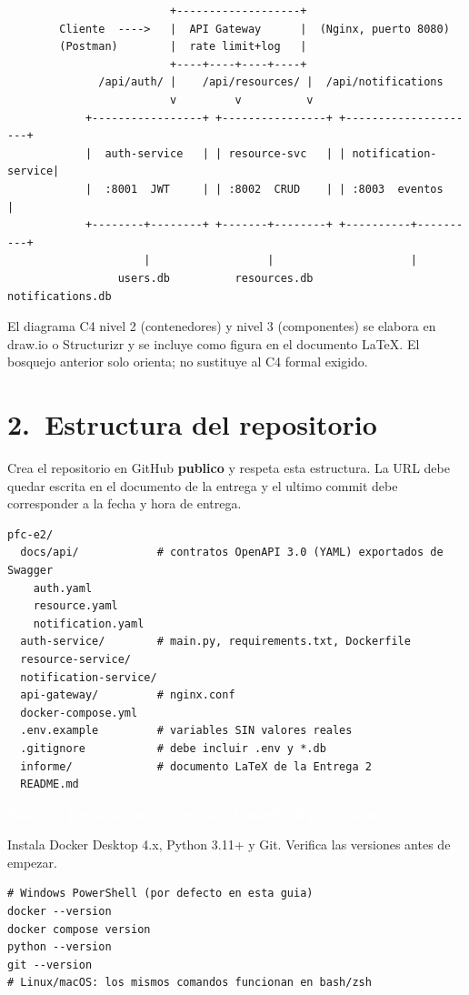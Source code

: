 \documentclass[11pt]{article}
\newcommand{\pasohead}[2]{%
\vspace{4pt}%
\begin{tcolorbox}[colback=azulMedio,colframe=azulMedio,boxrule=0pt,arc=2pt,left=8pt,right=8pt,top=4pt,bottom=4pt]
\textcolor{white}{\textbf{Paso #1.\ \ #2}}\end{tcolorbox}}
\begin{document}
\begin{lstlisting}
                         +-------------------+
        Cliente  ---->   |  API Gateway      |  (Nginx, puerto 8080)
        (Postman)        |  rate limit+log   |
                         +----+----+----+----+
              /api/auth/ |    /api/resources/ |  /api/notifications
                         v         v          v
            +-----------------+ +----------------+ +---------------------+
            |  auth-service   | | resource-svc   | | notification-service|
            |  :8001  JWT     | | :8002  CRUD    | | :8003  eventos      |
            +--------+--------+ +-------+--------+ +----------+----------+
                     |                  |                     |
                 users.db          resources.db         notifications.db
\end{lstlisting}

El diagrama C4 nivel 2 (contenedores) y nivel 3 (componentes) se elabora en draw.io o Structurizr y se incluye como figura en el documento LaTeX. El bosquejo anterior solo orienta; no sustituye al C4 formal exigido.

\section*{\textcolor{azulOscuro}{2.\ Estructura del repositorio}}
Crea el repositorio en GitHub \textbf{publico} y respeta esta estructura. La URL debe quedar escrita en el documento de la entrega y el ultimo commit debe corresponder a la fecha y hora de entrega.

\begin{lstlisting}
pfc-e2/
  docs/api/            # contratos OpenAPI 3.0 (YAML) exportados de Swagger
    auth.yaml
    resource.yaml
    notification.yaml
  auth-service/        # main.py, requirements.txt, Dockerfile
  resource-service/
  notification-service/
  api-gateway/         # nginx.conf
  docker-compose.yml
  .env.example         # variables SIN valores reales
  .gitignore           # debe incluir .env y *.db
  informe/             # documento LaTeX de la Entrega 2
  README.md
\end{lstlisting}

\pasohead{0}{Preparacion del entorno (PowerShell por defecto)}
Instala Docker Desktop 4.x, Python 3.11+ y Git. Verifica las versiones antes de empezar.
\begin{lstlisting}[language=shell]
# Windows PowerShell (por defecto en esta guia)
docker --version
docker compose version
python --version
git --version
# Linux/macOS: los mismos comandos funcionan en bash/zsh
\end{lstlisting}
\end{document}
